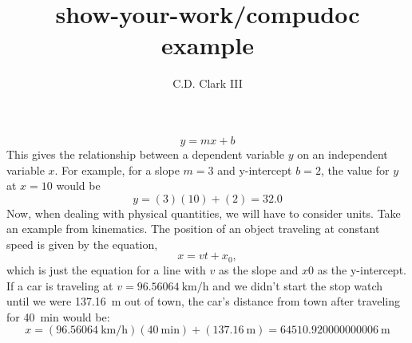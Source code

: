 \documentclass[]{article}
\author{C.D. Clark III}
\title{show-your-work/compudoc example}
\begin{document}
\maketitle

$$
y = mx + b
$$
This gives the relationship between a dependent variable $y$ on an independent variable $x$.
For example, for a slope $m = 3$ and y-intercept $b = 2$, the value for $y$ at $x = 10$ would be
$$
y = (3)(10) + (2) = 32.0
$$
Now, when dealing with physical quantities, we will have to consider units. Take an example from kinematics. The
position of an object traveling at constant speed is given by the equation,
$$
x = v t + x_0,
$$
which is just the equation for a line with $v$ as the slope and $x0$ as the y-intercept. If a car is traveling at
$v = \SI[]{96.56064}{\kilo\meter\per\hour}$ and we didn't start the stop watch until we were \SI[]{137.16}{\meter} out of town, the car's distance from town
after traveling for \SI[]{40}{\minute} would be:
$$
x = (\SI[]{96.56064}{\kilo\meter\per\hour}) (\SI[]{40}{\minute}) + (\SI[]{137.16}{\meter}) = \SI[]{64510.920000000006}{\meter}
$$
\end{document}
